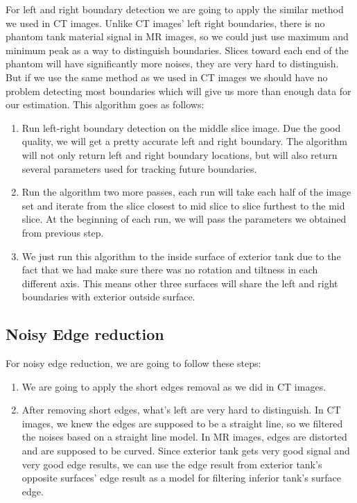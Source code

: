 For left and right boundary detection we are going to apply the similar method we used in CT images. 
Unlike CT images' left right boundaries, there is no phantom tank material signal in MR images, 
so we could just use maximum and minimum peak as a way to distinguish boundaries. Slices toward each end
of the phantom will have significantly more noises, they are very hard to distinguish. But if we use the same
method as we used in CT images we should have no problem detecting most boundaries which will give us more
than enough data for our estimation. This algorithm goes as follows:

\begin{enumerate}
  \item Run left-right boundary detection on the middle slice image. Due the good quality, we will get a 
    pretty accurate left and right boundary. The algorithm will not only return left and right boundary
    locations, but will also return several parameters used for tracking future boundaries.
  \item Run the algorithm two more passes, each run will take each half of the image set and iterate from
    the slice closest to mid slice to slice furthest to the mid slice. At the beginning of each run, we will
    pass the parameters we obtained from previous step.
  \item We just run this algorithm to the inside surface of exterior tank due to the fact that we had make
    sure there was no rotation and tiltness in each different axis. This means other three surfaces will
    share the left and right boundaries with exterior outside surface.
\end{enumerate}

\subsection{Noisy Edge reduction}

For noisy edge reduction, we are going to follow these steps:
\begin{enumerate}
  \item We are going to apply the short edges removal as we did in CT images. 
  \item After removing short edges, what's left are very hard to distinguish. In CT images, we knew the edges
    are supposed to be a straight line, so we filtered the noises based on a straight line model. In MR images,
    edges are distorted and are supposed to be curved. Since exterior tank gets very good signal and very good
    edge results, we can use the edge result from exterior tank's opposite surfaces' edge result as a model
    for filtering inferior tank's surface edge.
\end{enumerate}
